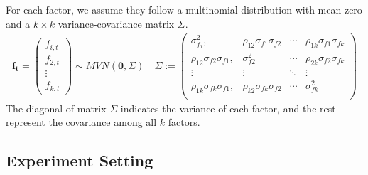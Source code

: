  For each factor, we assume they follow a multinomial distribution with mean zero and a $k\times k$ variance-covariance matrix $\Sigma$. 
\begin{align*}
\mathbf{f_t} = \begin{pmatrix}
f_{i,t}\\f_{2,t}\\\vdots\\f_{k,t}
\end{pmatrix} \sim MVN(\mathbf{0}, \Sigma) \quad
 \Sigma := 
\begin{pmatrix}
\sigma^2_{f_1}, & \rho_{12}\sigma_{f1}\sigma_{f2} &\cdots  & \rho_{1k}\sigma_{f1}\sigma_{fk}\\
\rho_{12}\sigma_{f2}\sigma_{f1}, & \sigma^2_{f2} &\cdots  & \rho_{2k}\sigma_{f2}\sigma_{fk}\\
\vdots & \vdots & \ddots & \vdots \\
\rho_{1k}\sigma_{fk}\sigma_{f1}, & \rho_{k2}\sigma_{fk}\sigma_{f2} &\cdots  & \sigma^2_{fk}\\
\end{pmatrix}
\end{align*}
The diagonal of matrix $\Sigma$ indicates the variance of each factor, and the rest represent the covariance among all $k$ factors.


	\subsection{Experiment Setting}\label{exp_set}



